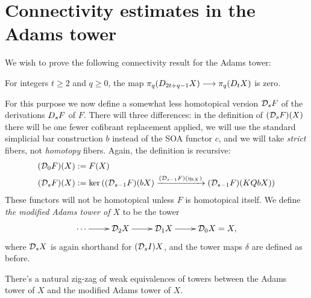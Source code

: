 \documentclass[11pt]{amsart}
\theoremstyle{plain}
\begin{document}
\section{Connectivity estimates in the Adams tower}
We wish to prove the following connectivity result for the Adams tower:
\begin{prop}\label{convergenceProp}
For integers $t\geq2$ and $q\geq0$, the map $\pi_q(\dupdown{2t+q-1}{c}X)\to\pi_q(\dupdown{t}{c}X)$ is zero.
\end{prop}
\label{sec:connectivityAnalysis}
For this purpose we now define a somewhat less homotopical version $\caldup{s}F$ of the derivations $\dupdown{s}{b}F$ of $F$. There will three differences: in the definition of $(\caldup{s}F)(X)$ there will be one fewer cofibrant replacement applied, we will use the standard simplicial bar construction $b$ instead of the SOA functor $c$, and we will take \emph{strict} fibers, not \emph{homotopy} fibers. Again, the definition is recursive:
\begin{alignat*}{2}
(\caldup{0}F)(X)
&:=
F(X)%
\\
(\caldup{s}F)(X)
&:=
\ker((\caldup{s-1}F)(bX)\xrightarrow{(\caldup{s-1}F)(\eta_{bX})} (\caldup{s-1}F)(KQbX))
\end{alignat*}
These functors will not be homotopical unless $F$ is homotopical itself. We define \emph{the modified Adams tower of $X$} to be the tower
\[\xymatrix@R=4mm{
\cdots 
\ar[r]
&%
\caldup{2}X
\ar[r]
&%
\caldup{1}X
\ar[r]&%
\caldup{0}X=X,
}\]
where $\caldup{s}X$ is again shorthand for $(\caldup{s}I)X$, and the tower maps $\delta$ are defined as before.
\begin{prop}\label{prop:modifiedAdamsTower}
There's a natural zig-zag of weak equivalences of towers between the Adams tower of $X$ and the modified Adams tower of $X$.
\end{prop}
\end{document}
